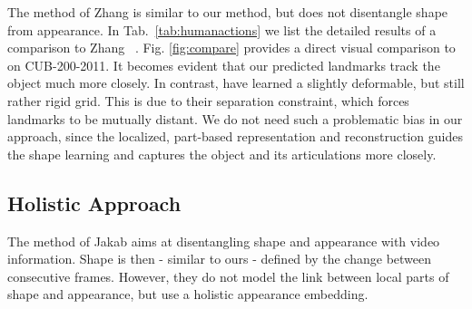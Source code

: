 			The method of Zhang \etal \cite{zhang18} is similar to our method, but does not disentangle shape from appearance.
			In Tab.~\ref{tab:humanactions} we list the detailed results of a comparison to Zhang \etal~\cite{zhang18}.
			Fig. \ref{fig:compare} provides a direct visual comparison to \cite{zhang18} on CUB-200-2011.
			It becomes evident that our predicted landmarks track the object much more closely.
			In contrast, \cite{zhang18} have learned a slightly deformable, but still rather rigid grid.
			This is due to their separation constraint, which forces landmarks to be mutually distant.
			We do not need such a problematic bias in our approach, since the localized, part-based representation and reconstruction guides the shape learning and captures the object and its articulations more closely.

		\subsection{Holistic Approach}\label{sec:jakab}
			The method of Jakab \etal \cite{jakab18} aims at disentangling shape and appearance with video information. Shape is then - similar to ours - defined by the change between consecutive frames. However, they do not model the link between local parts of shape and appearance, but use a holistic appearance embedding.

